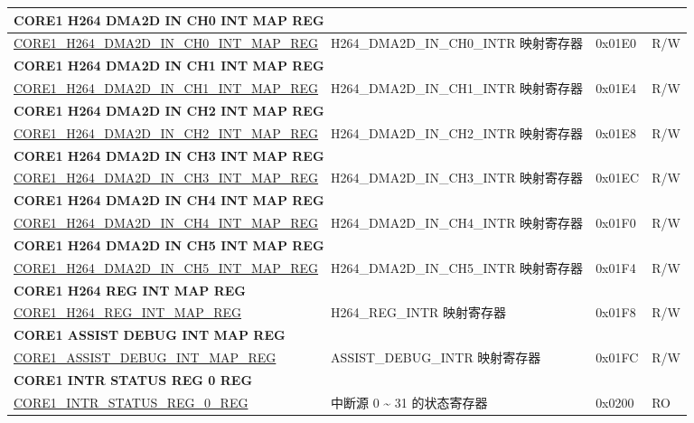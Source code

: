 \begin{longtable}{ | p{7.5cm} | p{7.2cm} | p{1.3cm} | p{1cm} | }
\multicolumn{4}{|l|}{\textbf{CORE1 H264 DMA2D IN CH0 INT MAP REG}} \\ \hline
\hyperref[regdesc:CORE1H264DMA2DINCH0INTMAPREG]{CORE1\_H264\_DMA2D\_IN\_CH0\_INT\_MAP\_REG} & H264\_DMA2D\_IN\_CH0\_INTR 映射寄存器 & 0x01E0 & R/W \\ \hline
\multicolumn{4}{|l|}{\textbf{CORE1 H264 DMA2D IN CH1 INT MAP REG}} \\ \hline
\hyperref[regdesc:CORE1H264DMA2DINCH1INTMAPREG]{CORE1\_H264\_DMA2D\_IN\_CH1\_INT\_MAP\_REG} & H264\_DMA2D\_IN\_CH1\_INTR 映射寄存器 & 0x01E4 & R/W \\ \hline
\multicolumn{4}{|l|}{\textbf{CORE1 H264 DMA2D IN CH2 INT MAP REG}} \\ \hline
\hyperref[regdesc:CORE1H264DMA2DINCH2INTMAPREG]{CORE1\_H264\_DMA2D\_IN\_CH2\_INT\_MAP\_REG} & H264\_DMA2D\_IN\_CH2\_INTR 映射寄存器 & 0x01E8 & R/W \\ \hline
\multicolumn{4}{|l|}{\textbf{CORE1 H264 DMA2D IN CH3 INT MAP REG}} \\ \hline
\hyperref[regdesc:CORE1H264DMA2DINCH3INTMAPREG]{CORE1\_H264\_DMA2D\_IN\_CH3\_INT\_MAP\_REG} & H264\_DMA2D\_IN\_CH3\_INTR 映射寄存器 & 0x01EC & R/W \\ \hline
\multicolumn{4}{|l|}{\textbf{CORE1 H264 DMA2D IN CH4 INT MAP REG}} \\ \hline
\hyperref[regdesc:CORE1H264DMA2DINCH4INTMAPREG]{CORE1\_H264\_DMA2D\_IN\_CH4\_INT\_MAP\_REG} & H264\_DMA2D\_IN\_CH4\_INTR 映射寄存器 & 0x01F0 & R/W \\ \hline
\multicolumn{4}{|l|}{\textbf{CORE1 H264 DMA2D IN CH5 INT MAP REG}} \\ \hline
\hyperref[regdesc:CORE1H264DMA2DINCH5INTMAPREG]{CORE1\_H264\_DMA2D\_IN\_CH5\_INT\_MAP\_REG} & H264\_DMA2D\_IN\_CH5\_INTR 映射寄存器 & 0x01F4 & R/W \\ \hline
\multicolumn{4}{|l|}{\textbf{CORE1 H264 REG INT MAP REG}} \\ \hline
\hyperref[regdesc:CORE1H264REGINTMAPREG]{CORE1\_H264\_REG\_INT\_MAP\_REG} & H264\_REG\_INTR 映射寄存器 & 0x01F8 & R/W \\ \hline
\multicolumn{4}{|l|}{\textbf{CORE1 ASSIST DEBUG INT MAP REG}} \\ \hline
\hyperref[regdesc:CORE1ASSISTDEBUGINTMAPREG]{CORE1\_ASSIST\_DEBUG\_INT\_MAP\_REG} & ASSIST\_DEBUG\_INTR 映射寄存器 & 0x01FC & R/W \\ \hline
\multicolumn{4}{|l|}{\textbf{CORE1 INTR STATUS REG 0 REG}} \\ \hline
\hyperref[regdesc:CORE1INTRSTATUSREG0REG]{CORE1\_INTR\_STATUS\_REG\_0\_REG} & 中断源 0 \~{} 31 的状态寄存器 & 0x0200 & RO \\ \hline

\end{longtable}
